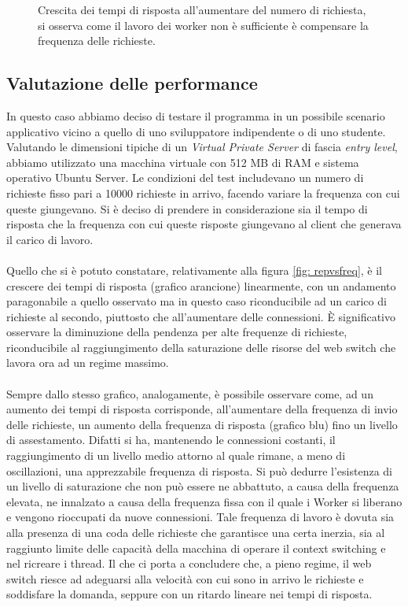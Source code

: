 \documentclass[italian]{tktltiki2}
\begin{document}
\begin{figure}[H]
\caption{Crescita dei tempi di risposta all'aumentare del numero di richiesta, si osserva come il lavoro dei worker non è sufficiente è compensare la frequenza delle richieste. \label{fig: cfr_reply_time2}}
\end{figure}
\subsection{Valutazione delle performance}
In questo caso abbiamo deciso di testare il programma in un possibile scenario applicativo vicino a quello di uno sviluppatore indipendente o di uno studente. Valutando le dimensioni tipiche di un \emph{Virtual Private Server} di fascia \emph{entry level}, abbiamo utilizzato una macchina virtuale con 512 MB di RAM e sistema operativo Ubuntu Server. Le condizioni del test includevano un numero di richieste fisso pari a 10000 richieste in arrivo, facendo variare la frequenza con cui queste giungevano. Si è deciso di prendere in considerazione sia il tempo di risposta che la frequenza con cui queste risposte giungevano al client che generava il carico di lavoro. \\\\ 
Quello che si è potuto constatare, relativamente alla figura \ref{fig: repvsfreq}, è il crescere dei tempi di risposta (grafico arancione) linearmente, con un andamento paragonabile a quello osservato ma in questo caso riconducibile ad un carico di richieste al secondo, piuttosto che all'aumentare delle connessioni. È significativo osservare la diminuzione della pendenza per alte frequenze di richieste, riconducibile al raggiungimento della saturazione delle risorse del web switch che lavora ora ad un regime massimo.\\\\
Sempre dallo stesso grafico, analogamente, è possibile osservare come, ad un aumento dei tempi di risposta corrisponde, all'aumentare della frequenza di invio delle richieste, un aumento della frequenza di risposta (grafico blu) fino un livello di assestamento. Difatti si ha, mantenendo le connessioni costanti, il raggiungimento di un livello medio attorno al quale rimane, a meno di oscillazioni, una apprezzabile frequenza di risposta. Si può dedurre l'esistenza di un livello di saturazione che non può essere ne abbattuto, a causa della frequenza elevata, ne innalzato a causa della frequenza fissa con il quale i Worker si liberano e vengono rioccupati da nuove connessioni. Tale frequenza di lavoro è dovuta sia alla presenza di una coda delle richieste che garantisce una certa inerzia, sia al raggiunto limite delle capacità della macchina di operare il context switching e nel ricreare i thread. Il che ci porta a concludere che, a pieno regime, il web switch riesce ad adeguarsi alla velocità con cui sono in arrivo le richieste e soddisfare la domanda, seppure con un ritardo lineare nei tempi di risposta.
\end{document}
